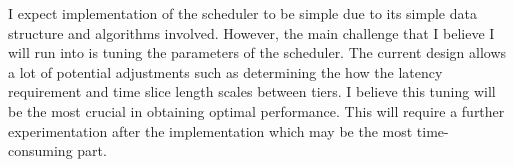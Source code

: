 \documentclass[letterpaper,twocolumn,10pt]{article}
\begin{document}
I expect implementation of the scheduler to be simple due to its simple data
structure and algorithms involved. However, the main challenge that I believe
I will run into is tuning the parameters of the scheduler. The current design
allows a lot of potential adjustments such as determining the how the latency
requirement and time slice length scales between tiers. I believe this tuning
will be the most crucial in obtaining optimal performance. This will require
a further experimentation after the implementation which may be the most
time-consuming part.




\end{document}
